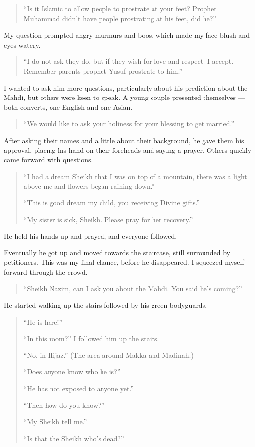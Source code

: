 \documentclass[12pt]{memoir}
\newcommand{\cor}[2]{#2} %
\begin{document}
\begin{quote}
“Is it Islamic to allow people to prostrate at your feet?
Prophet Muhammad didn’t have people prostrating at his feet, did he?”
\end{quote}

My question prompted angry murmurs and boos,
which made my face blush and eyes \cor{water}{watery}.

\begin{quote}
“I do not ask they do, but if they wish for love and respect, I accept.
Remember parents prophet Yusuf prostrate to him.”
\end{quote}

I wanted to ask him more questions,
particularly about his prediction about the Mahdi,
but others were keen to speak.
A young couple presented themselves —
both converts, one English and one Asian.

\begin{quote}
“We would like to ask your holiness for your blessing to get married.”
\end{quote}

After asking their names and a little about their background,
he gave them his approval,
placing his hand on their foreheads and saying a prayer.
Others quickly came forward with questions.

\begin{quote}
“I had a dream Sheikh that I was on top of a mountain,
there was a light above me and flowers began raining down.”

“This is good dream my child, you receiving Divine gifts.”

“My sister is sick, Sheikh. Please pray for her recovery.”
\end{quote}

He held his hands up and prayed, and everyone followed.

Eventually he got up and moved towards the staircase,
still surrounded by petitioners.
This was my final chance, before he disappeared.
I squeezed myself forward through the crowd.

\begin{quote}
“Sheikh Nazim, can I ask you about the Mahdi. You said he’s coming?”
\end{quote}

He started walking up the stairs followed by his green bodyguards.

\begin{quote}
“He is here!”

“In this room?” I followed him up the stairs.

“No, in Hijaz.” (The area around Makka and Madinah.)

“Does anyone know who he is?”

“He has not exposed to anyone yet.”

“Then how do you know?”

“My Sheikh tell me.”

“Is that the Sheikh who’s dead?”
\end{quote}
\end{document}
